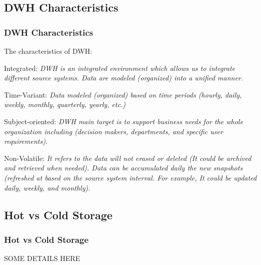 \subsection{DWH Characteristics}
\begin{frame}
\frametitle{DWH Characteristics}
\begin{wideitemize}
\item The characteristics of DWH:
	\begin{wideitemize}
		\item Integrated: \textit{DWH is an integrated environment which allows us to integrate different source systems. Data are modeled (organized) into a unified manner.} %
	
		\item Time-Variant: \textit{Data modeled (organized) based on time periods (hourly, daily, weekly, monthly, quarterly, yearly, etc.)}
	
		\item Subject-oriented: \textit{DWH main target is to support business needs for the whole organization including (decision makers, departments, and specific user requirements)}.
	
		\item Non-Volatile: \textit{It refers to the data will not erased or deleted (It could be archived and retrieved when needed). Data can be accumulated daily the new snapshots (refreshed at based on the source system interval. For example, It could be updated daily, weekly, and monthly).}
	\end{wideitemize}	
\end{wideitemize}

\end{frame}

\subsection{Hot vs Cold Storage}
\begin{frame}
\frametitle{Hot vs Cold Storage}
SOME DETAILS HERE
\end{frame}

